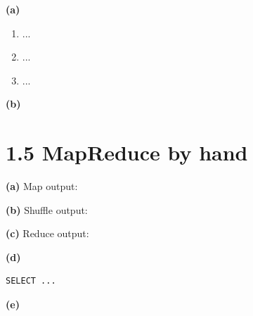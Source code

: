 \textbf{(a)}
\begin{enumerate}
  \item ...
  \item ...
  \item ...
\end{enumerate}

\textbf{(b)}

\section*{1.5 MapReduce by hand}

\textbf{(a)} Map output:

\textbf{(b)} Shuffle output:

\textbf{(c)} Reduce output:

\textbf{(d)}
\begin{lstlisting}
SELECT ...
\end{lstlisting}

\textbf{(e)}


